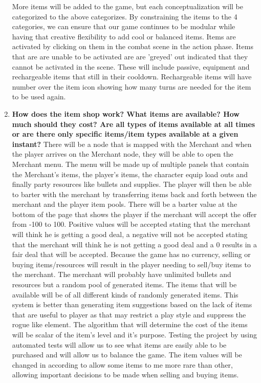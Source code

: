\documentclass[12pt, titlepage]{article}
\begin{document}
\begin{enumerate}
\begin{enumerate}
	\end{enumerate}
	More items will be added to the game, but each conceptualization will be categorized to the above categorizes. By constraining the items to the 4 categories, we can ensure that our game continues to be modular while having that creative flexibility to add cool or balanced items.
	Items are activated by clicking on them in the combat scene in the action phase. Items that are are unable to be activated are are 'greyed' out indicated that they cannot be activated in the scene. These will include passive, equipment and rechargeable items that still in their cooldown. Rechargeable items will have number over the item icon showing how many turns are needed for the item to be used again.
	\item \textbf{How does the item shop work? What items are available? How much should they cost? Are all types of items available at all times or are there only specific items/item types available at a given instant?}
	There will be a node that is mapped with the Merchant and when the player arrives on the Merchant node, they will be able to open the Merchant menu. The menu will be made up of multiple panels that contain the Merchant's items, the player's items, the character equip load outs and finally party resources like bullets and supplies. The player will then be able to barter with the merchant by transferring items back and forth between the merchant and the player item pools. There will be a barter value at the bottom of the page that shows the player if the merchant will accept the offer from -100 to 100. Positive values will be accepted stating that the merchant will think he is getting a good deal, a negative will not be accepted stating that the merchant will think he is not getting a good deal and a 0 results in a fair deal that will be accepted. Because the game has no currency, selling or buying items/resources will result in the player needing to sell/buy items to the merchant. The merchant will probably have unlimited bullets and resources but a random pool of generated items. 
	The items that will be available will be of all different kinds of randomly generated items. This system is better than generating item suggestions based on the lack of items that are useful to player as that may restrict a play style and suppress the rogue like element. 
	The algorithm that will determine the cost of the items will be scalar of the item's level and it's purpose. Testing the project by using automated tests will allow us to see what items are easily able to be purchased and will allow us to balance the game. The item values will be changed in according to allow some items to me more rare than other, allowing important decisions to be made when selling and buying items.

\end{enumerate}
\end{document}
